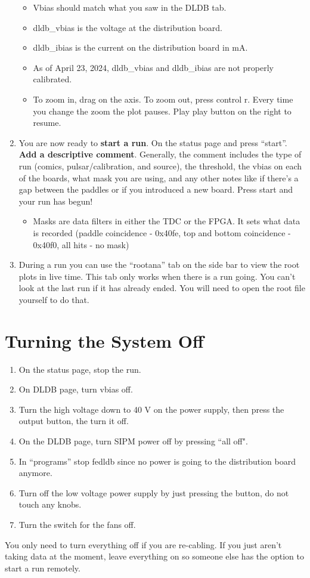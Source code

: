 \documentclass{article}
\begin{document}
\begin{enumerate}
\begin{itemize}
        \item Vbias should match what you saw in the DLDB tab.
        \item dldb\_vbias is the voltage at the distribution board.
        \item dldb\_ibias is the current on the distribution board in mA.
        \item As of April 23, 2024, dldb\_vbias and dldb\_ibias are not properly calibrated.
        \item To zoom in, drag on the axis. To zoom out, press control r. Every time you change the zoom the plot pauses. Play play button on the right to resume.
    \end{itemize}
    \item You are now ready to \textbf{start a run}. On the status page and press “start”. \textbf{Add a descriptive comment}. Generally, the comment includes the type of run (comics, pulsar/calibration, and source), the threshold, the vbias on each of the boards, what mask you are using, and any other notes like if there’s a gap between the paddles or if you introduced a new board. Press start and your run has begun!
    \begin{itemize}
        \item Masks are data filters in either the TDC or the FPGA. It sets what data is recorded (paddle coincidence - 0x40fe, top and bottom coincidence - 0x40f0, all hits - no mask)
    \end{itemize}
    \item During a run you can use the “rootana” tab on the side bar to view the root plots in live time. This tab only works when there is a run going. You can’t look at the last run if it has already ended. You will need to open the root file yourself to do that.
\end{enumerate}

\section*{Turning the System Off}
\begin{enumerate}
    \item On the status page, stop the run.
    \item On DLDB page, turn vbias off.
    \item Turn the high voltage down to 40 V on the power supply, then press the output button, the turn it off.
    \item On the DLDB page, turn SIPM power off by pressing ``all off".
    \item In “programs” stop fedldb since no power is going to the distribution board anymore.
    \item Turn off the low voltage power supply by just pressing the button, do not touch any knobs.
    \item Turn the switch for the fans off.
\end{enumerate}

You only need to turn everything off if you are re-cabling. If you just aren't taking data at the moment, leave everything on so someone else has the option to start a run remotely.

\end{document}
